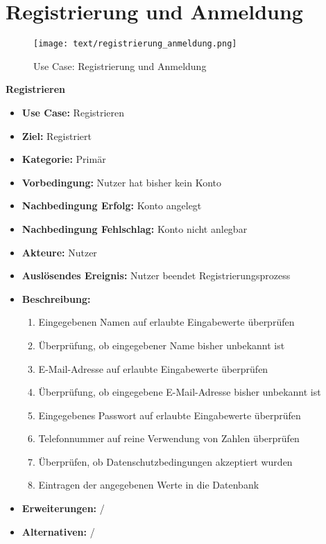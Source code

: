 \section{Registrierung und Anmeldung}
\begin{figure}[h!]
	\centering
	\texttt{[image: text/registrierung\_anmeldung.png]}
	\caption{Use Case: Registrierung und Anmeldung}
	\label{uc_reg_anm}
\end{figure}
\textbf{Registrieren}
\begin{itemize}
	\item \textbf{Use Case:} Registrieren
	\item \textbf{Ziel:} Registriert
	\item \textbf{Kategorie:} Primär
	\item \textbf{Vorbedingung:} Nutzer hat bisher kein Konto
	\item \textbf{Nachbedingung Erfolg:} Konto angelegt
	\item \textbf{Nachbedingung Fehlschlag:} Konto nicht anlegbar
	\item \textbf{Akteure:} Nutzer
	\item \textbf{Auslösendes Ereignis:} Nutzer beendet Registrierungsprozess
	\item \textbf{Beschreibung:} \begin{enumerate}
		\item Eingegebenen Namen auf erlaubte Eingabewerte überprüfen
		\item Überprüfung, ob eingegebener Name bisher unbekannt ist
		\item E-Mail-Adresse auf erlaubte Eingabewerte überprüfen
		\item Überprüfung, ob eingegebene E-Mail-Adresse bisher unbekannt ist
		\item Eingegebenes Passwort auf erlaubte Eingabewerte überprüfen
		\item Telefonnummer auf reine Verwendung von Zahlen überprüfen
		\item Überprüfen, ob Datenschutzbedingungen akzeptiert wurden
		\item Eintragen der angegebenen Werte in die Datenbank
	\end{enumerate}
	\item \textbf{Erweiterungen:} /
	\item \textbf{Alternativen:} /
\end{itemize}


